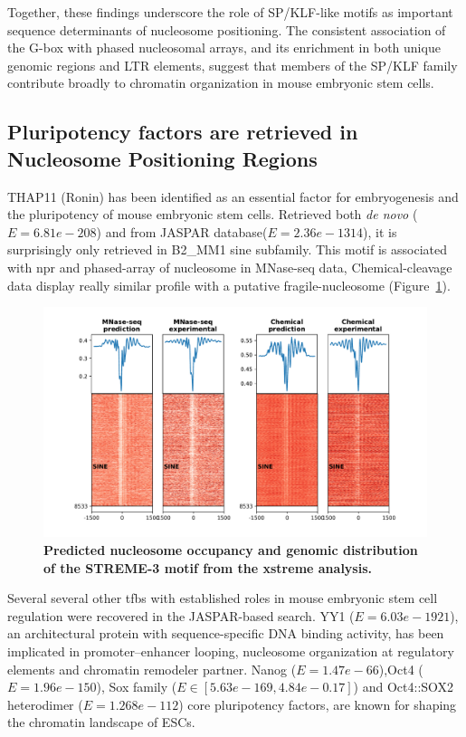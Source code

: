 \documentclass[11pt]{book}
\begin{document}
Together, these findings underscore the role of SP/KLF-like motifs as important sequence determinants of nucleosome positioning. The consistent association of the G-box with phased nucleosomal arrays, and its enrichment in both unique genomic regions and LTR elements, suggest that members of the SP/KLF family contribute broadly to chromatin organization in mouse embryonic stem cells.

\FloatBarrier
\subsection{Pluripotency factors are retrieved in Nucleosome Positioning Regions}

THAP11 (Ronin) has been identified as an essential factor for embryogenesis and the pluripotency of mouse embryonic stem cells\cite{dejosez_ronin_2008}. Retrieved both \textit{de novo} ($E=6.81e-208$) and from JASPAR database($E=2.36e-1314$), it is surprisingly only retrieved in B2\_MM1 \gls{sine} subfamily. This motif is associated with \gls{npr} and phased-array of nucleosome in MNase-seq data, Chemical-cleavage data display really similar profile with a putative fragile-nucleosome (Figure~\ref{fig:xstreme_3}).

\begin{figure}[htbp]
    \centering
    \includegraphics[trim=0cm 0cm 0cm 0cm, clip, width=\textwidth]{Figures/Results/xstreme_onrep_meta_hm/3-CTGGGATTTGAACTC_withexp.pdf}
    \caption{\textbf{Predicted nucleosome occupancy and genomic distribution of the STREME-3 motif from the xstreme analysis.}}
    \label{fig:xstreme_3}
\end{figure}

Several several other \gls{tfbs} with established roles in mouse embryonic stem cell regulation were recovered in the JASPAR-based search. YY1 ($E=6.03e-1921$), an architectural protein with sequence-specific DNA binding activity, has been implicated in promoter–enhancer looping, nucleosome organization at regulatory elements and chromatin remodeler partner\cite{tyagi_chromatin_2016}. Nanog ($E=1.47e-66$),Oct4 ($E=1.96e-150$), Sox family ($E\in[5.63e-169, 4.84e-0.17]$) and Oct4::SOX2 heterodimer ($E=1.268e-112$) core pluripotency factors, are known for shaping the chromatin landscape of ESCs\cite{festuccia_transcription_2019}.
\end{document}
